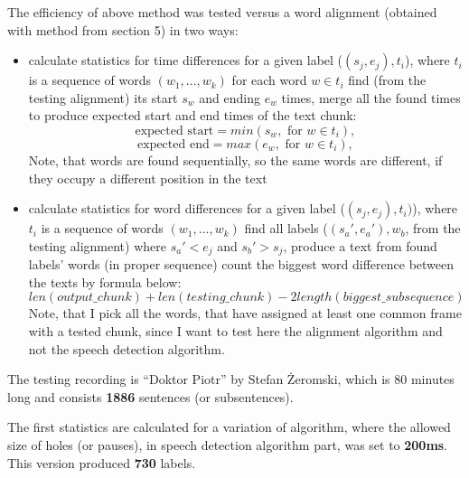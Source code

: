 \documentclass[12pt,a4paper,english]{article}
\begin{document}
The efficiency of above method was tested versus a word alignment (obtained with method from section 5) in two ways:
\begin{itemize}
    \item calculate statistics for time differences 
          \subitem for a given label ($(s_j, e_j), t_i$), where $t_i$ is a sequence of words $(w_1, ..., w_k)$
          \subitem for each word $w \in t_i$ find (from the testing alignment) its start $s_{w}$ and ending $e_{w}$ times,
          \subitem merge all the found times to produce expected start and end times of the text chunk:
            \begin{equation}
                \text{expected start} = min(s_{w}, \text{ for } w \in t_i),
            \end{equation}
            \begin{equation}
                \text{expected end} = max(e_{w}, \text{ for } w \in t_i),
            \end{equation}
          \subitem Note, that words are found sequentially, so the same words are different, if they occupy a different position in the text
    \item calculate statistics for word differences
          \subitem for a given label ($(s_j, e_j), t_i)$), where $t_i$ is a sequence of words $(w_1, ..., w_k)$
          \subitem find all labels ($(s_a', e_a'), w_b$, from the testing alignment) where $s_a' < e_j$ and $s_b' > s_j$,
          \subitem produce a text from found labels' words (in proper sequence)
          \subitem count the biggest word difference between the texts by formula below:
          \begin{equation}
               len(output\_chunk) + len(testing\_chunk) - 2 length(biggest\_subsequence)
          \end{equation}
          \subitem Note, that I pick all the words, that have assigned at least one common frame with a tested chunk, since I want to test here the alignment algorithm and not the speech detection algorithm.
\end{itemize}
The testing recording is “Doktor Piotr” by Stefan Żeromski, which is 80 minutes long and consists \textbf{1886} sentences (or subsentences). \newline

\newpage

The first statistics are calculated for a variation of algorithm, where the allowed size of holes (or pauses), in speech detection algorithm part,
was set to \textbf{200ms}. This version produced \textbf{730} labels. \newline
\end{document}
